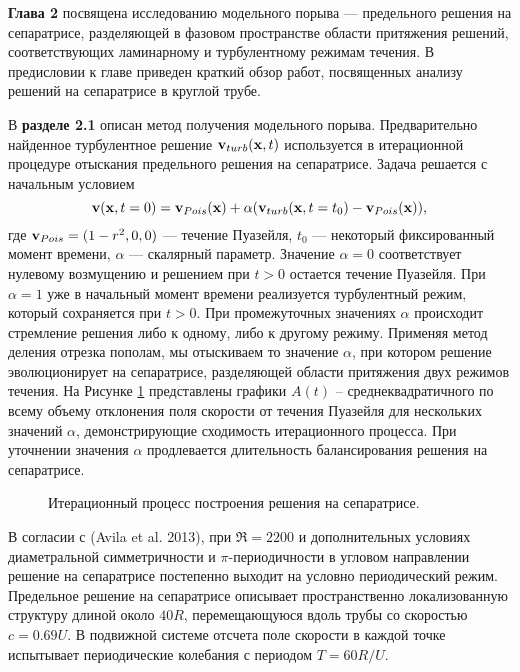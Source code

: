 \textbf{Глава 2} посвящена исследованию модельного порыва --- предельного решения на сепаратрисе, разделяющей в фазовом пространстве области притяжения решений, соответствующих ламинарному и турбулентному режимам течения. В предисловии к главе приведен краткий обзор работ, посвященных анализу решений на сепаратрисе в круглой трубе. 

В \textbf{разделе 2.1} описан метод получения модельного порыва. Предварительно найденное турбулентное решение $\mathbf{v}_{turb}(\mathbf{x},t)$ используется в итерационной процедуре отыскания предельного решения на сепаратрисе. Задача решается с начальным условием
\begin{equation} \label{edge_init_eq}
\mathbf{v}(\mathbf{x},t=0) = \mathbf{v}_{Pois}(\mathbf{x})+\alpha(\mathbf{v}_{turb}(\mathbf{x},t=t_0) - \mathbf{v}_{Pois}(\mathbf{x})),
\end{equation}
где $\mathbf{v}_{Pois}=(1-r^2,0,0)$ --- течение Пуазейля, $t_0$ --- некоторый фиксированный момент времени, $\alpha$ --- скалярный параметр. Значение $\alpha=0$ соответствует нулевому возмущению и решением при $t > 0$ остается течение Пуазейля. При $\alpha=1$ уже в начальный момент времени реализуется турбулентный режим, который сохраняется при $t > 0$. При промежуточных значениях $\alpha$ происходит стремление решения либо к одному, либо к другому режиму. Применяя метод деления отрезка пополам, мы отыскиваем то значение $\alpha$, при котором решение эволюционирует на сепаратрисе, разделяющей области притяжения двух режимов течения. На Рисунке \ref{bisection_pic} представлены графики $A(t)$ – среднеквадратичного по всему объему отклонения поля скорости от течения Пуазейля для нескольких значений $\alpha$, демонстрирующие сходимость итерационного процесса. При уточнении значения $\alpha$ продлевается длительность балансирования решения на сепаратрисе.

\begin{figure}
\caption{Итерационный процесс построения решения на сепаратрисе.}
\label{bisection_pic}
\end{figure}

В согласии с (Avila et al. 2013), при $\Re=2200$ и дополнительных условиях диаметральной симметричности и $\pi$-периодичности в угловом направлении решение на сепаратрисе постепенно выходит на условно периодический режим. Предельное решение на сепаратрисе описывает пространственно локализованную структуру длиной около $40R$, перемещающуюся вдоль трубы со скоростью $c=0.69U$. В подвижной системе отсчета поле скорости в каждой точке испытывает периодические колебания с периодом $T=60R/U$. 

